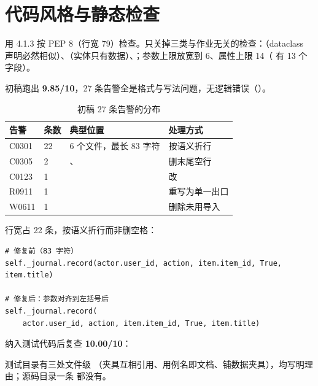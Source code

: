 \section{代码风格与静态检查}

用  4.1.3 按 PEP 8（行宽 79）检查。只关掉三类与作业无关的检查：（dataclass 声明必然相似）、（实体只有数据）、；参数上限放宽到 6、属性上限 14（ 有 13 个字段）。

初稿跑出 \textbf{9.85/10}，27 条告警全是格式与写法问题，无逻辑错误（）。

\begin{table}[htbp]
\centering
\caption{初稿 27 条告警的分布}\label{tab:pylintinit}
\renewcommand{\arraystretch}{1.15}
\begin{tabularx}{\textwidth}{@{}L{5.0cm}L{1.2cm}L{3.6cm}Y@{}}
\toprule
告警 & 条数 & 典型位置 & 处理方式 \\
\midrule
{} C0301 & 22 & 6 个文件，最长 83 字符 & 按语义折行 \\
 C0305 & 2 & 、 & 删末尾空行 \\
 C0123 & 1 &  &  改  \\
 R0911 & 1 &  & 重写为单一出口 \\
 W0611 & 1 &  & 删除未用导入 \\
\bottomrule
\end{tabularx}
\end{table}

行宽占 22 条，按语义折行而非删空格：

\begin{lstlisting}
# 修复前（83 字符）
self._journal.record(actor.user_id, action, item.item_id, True, item.title)

# 修复后：参数对齐到左括号后
self._journal.record(
    actor.user_id, action, item.item_id, True, item.title)
\end{lstlisting}

纳入测试代码后复查 \textbf{10.00/10}：



测试目录有三处文件级 （夹具互相引用、用例名即文档、铺数据夹具），均写明理由；源码目录一条  都没有。
